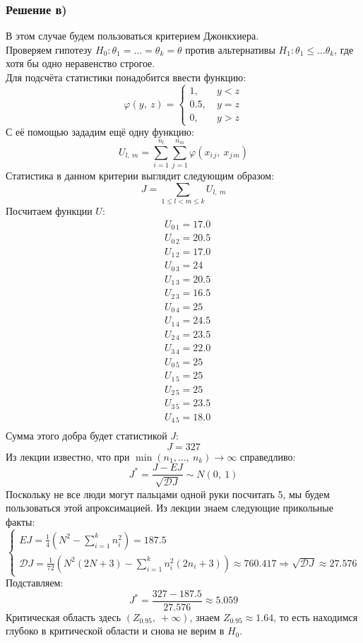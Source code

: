 \documentclass[12pt, a4paper]{article}
\newcommand{\dev}{\mathcal{D}}
\newcommand{\oo}{\infty}
\begin{document}
\subsubsection*{Решение в)}
В этом случае будем пользоваться критерием Джонкхиера.\\
Проверяем гипотезу $H_0: \theta_1 = \dots = \theta_k = \theta$ против альтернативы $H_1: \theta_1 \leq \dots \theta_k$, где хотя бы одно неравенство строгое.\\
Для подсчёта статистики понадобится ввести функцию:
\[\varphi(y,\ z) = \begin{cases}
    1,\ & y < z\\
    0.5,\ & y = z\\
    0,\ & y > z
\end{cases}\]
С её помощью зададим ещё одну функцию:
\[U_{l,\ m} = \sum_{ i = 1}^{n_l} \sum_{j = 1}^{n_m} \varphi\left( x_{i\, j},\ x_{j\, m} \right)\]
Статистика в данном критерии выглядит следующим образом:
\[J = \sum_{1 \leq l < m \leq k} U_{l,\ m}\]
Посчитаем функции $U$:
\begin{equation*}
    \begin{aligned}
        & U_{0\, 1} = 17.0\\
        & U_{0\, 2} = 20.5\\
        & U_{1\, 2} = 17.0\\
        & U_{0\, 3} = 24\\
        & U_{1\, 3} = 20.5\\
        & U_{2\, 3} = 16.5\\
        & U_{0\, 4} = 25\\
        & U_{1\, 4} = 24.5\\
        & U_{2\, 4} = 23.5\\
        & U_{3\, 4} = 22.0\\
        & U_{0\, 5} = 25\\
        & U_{1\, 5} = 25\\
        & U_{2\, 5} = 25\\
        & U_{3\, 5} = 23.5\\
        & U_{4\, 5} = 18.0\\
    \end{aligned}
\end{equation*}
Сумма этого добра будет статистикой $J$:
\[J = 327\]
Из лекции известно, что при $\min(n_1,\dots,\ n_k) \to \oo$ справедливо:
\[J^* = \frac{J - EJ}{\sqrt{\dev J}} \sim N(0,\ 1)\]
Поскольку не все люди могут пальцами одной руки посчитать 5, мы будем пользоваться этой апроксимацией. Из лекции знаем следующие прикольные факты:
\[\begin{cases}
    EJ = \frac{1}{4} {\left( N^2 - \sum\limits_{i = 1}^{k} n_i^2 \right)} = 187.5\\
    \dev J = \frac{1}{72} \left( N^2 (2N + 3) - \sum\limits_{i = 1}^{k} n_i^2(2n_i + 3) \right) \approx 760.417\Rightarrow \sqrt{\dev J} \approx 27.576
\end{cases}\] 
Подставляем:
\[ J^* = \frac{327 - 187.5}{27.576} \approx 5.059 \]
Критическая область здесь $(Z_{0.95},\ +\infty)$, знаем $Z_{0.95} \approx 1.64$, то есть находимся глубоко в критической области и снова не верим в $H_0$. 
\end{document}
